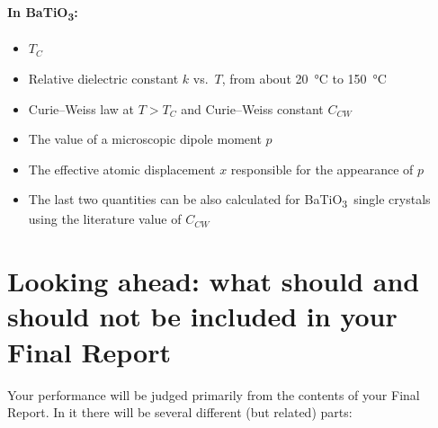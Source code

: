 \documentclass[11pt,a4paper]{article}
\newcommand{\BTO}{BaTiO\textsubscript{3}}
\begin{document}
\paragraph{In \BTO:}
\begin{itemize}
  \item $T_C$
  \item Relative dielectric constant $k$ vs.\ $T$, from about
        \SI{20}{\degreeCelsius} to \SI{150}{\degreeCelsius}
  \item Curie--Weiss law at $T > T_C$ and Curie--Weiss constant $C_{CW}$
  \item The value of a microscopic dipole moment $p$
  \item The effective atomic displacement $x$ responsible for the appearance of
        $p$
  \item The last two quantities can be also calculated for \BTO\ single crystals
        using the literature value of $C_{CW}$
\end{itemize}

\section{Looking ahead: what should and should not be included in your Final
         Report}\label{sec:report}

Your performance will be judged primarily from the contents of your Final
Report. In it there will be several different (but related) parts:
\end{document}
